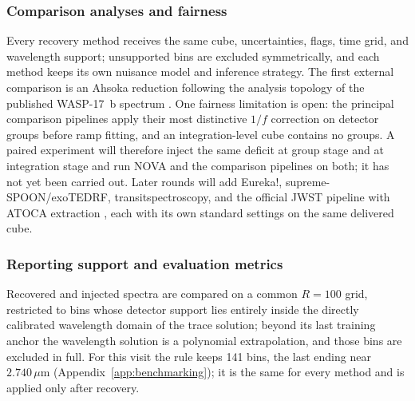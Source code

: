 \subsubsection{Comparison analyses and fairness}


Every recovery method receives the same cube, uncertainties, flags, time
grid, and wavelength support; unsupported bins are excluded
symmetrically, and each method keeps its own nuisance model and inference
strategy. The first external comparison is an Ahsoka reduction following
the analysis topology of the published WASP-17~b spectrum
\citep{LouieEtAl2025}. One fairness limitation is open: the principal
comparison pipelines apply their most distinctive $1/f$ correction on
detector groups before ramp fitting, and an integration-level cube
contains no groups. A paired experiment will therefore inject the same
deficit at group stage and at integration stage and run NOVA and the
comparison pipelines on both; it has not yet been carried out. Later
rounds will add Eureka!, supreme-SPOON/exoTEDRF, transitspectroscopy, and
the official JWST pipeline with ATOCA extraction
\citep{BellEtAl2022,Radica2024,Espinoza2022TransitSpectroscopy,%
JWSTPipeline2025,DarveauBernierEtAl2022,LouieEtAl2025}, each with its own
standard settings on the same delivered cube.

\subsubsection{Reporting support and evaluation metrics}


Recovered and injected spectra are compared on a common $R=100$ grid,
restricted to bins whose detector support lies entirely inside the
directly calibrated wavelength domain of the trace solution; beyond its
last training anchor the wavelength solution is a polynomial
extrapolation, and those bins are excluded in full. For this visit the
rule keeps 141 bins, the last ending near $2.740\,\mu\mathrm{m}$
(Appendix~\ref{app:benchmarking}); it is the same for every method and is
applied only after recovery.

